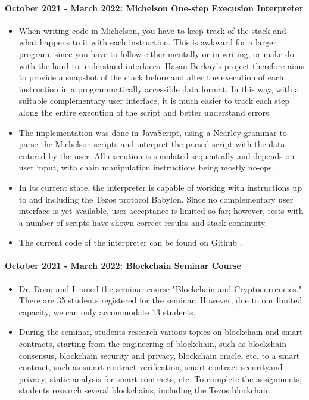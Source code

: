 \documentclass[a4paper,11pt]{article}
\begin{document}
\paragraph{October 2021 - March 2022: Michelson One-step Execusion Interpreter} 
\begin{itemize}
\item When writing code in Michelson, you have to keep track of the stack and what happens to it with each instruction. This is awkward for a larger program, since you have to follow either mentally or in writing, or make do with the hard-to-understand interfaces. Hasan Berkay's project therefore aims to provide a snapshot of the stack before and after the execution of each instruction in a programmatically accessible data format. In this way, with a suitable complementary user interface, it is much easier to track each step along the entire execution of the script and better understand errors. 
\item The implementation was done in
JavaScript, using a Nearley grammar to parse the Michelson scripts and interpret the parsed script with the data entered by the user.
All execution is simulated sequentially and depends on user input, with chain manipulation instructions being mostly no-ops. 
\item In its current state, the interpreter is capable of working with instructions up to and including the Tezos protocol Babylon. Since no complementary user interface is yet available, user acceptance is limited so far; however, tests with a number of scripts have shown correct results and stack continuity.
\item The current code of the interpreter can be found on Github \cite{michelson-interpreter}.
\end{itemize}

\paragraph{October 2021 - March 2022: Blockchain Seminar Course} 
\begin{itemize}
\item Dr. Doan and I runed the seminar course "Blockchain and Cryptocurrencies." There are 35 students registered for the seminar. However, due to our limited capacity, we can only accommodate 13 students. 
\item During the seminar, students research various topics on blockchain and smart contracts, starting from the engineering of blockchain, such as blockchain consensus, blockchain security and privacy, blockchain oracle, etc. to a smart contract, such as smart contract verification, smart contract securityand privacy, static analysis for smart contracts, etc. To complete the assignments, students research several blockchains, including the Tezos blockchain.
\end{itemize}
\end{document}
